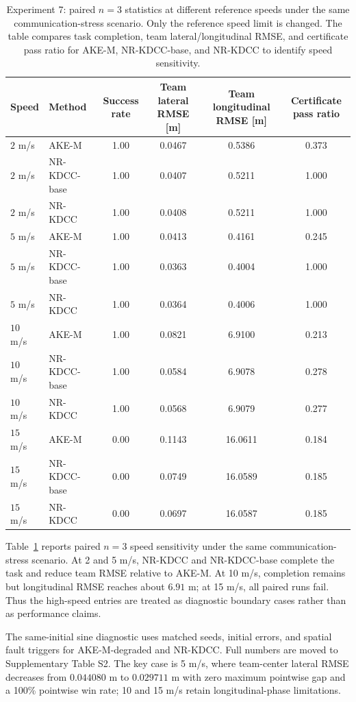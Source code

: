 \documentclass[twocolumn,3p,times,procedia]{elsarticle}
\newcommand{\AKE}{AKE-M}
\newcommand{\Method}{NR-KDCC}
\newcommand{\AKEdeg}{AKE-M-degraded}
\newcommand{\MethodBase}{NR-KDCC-base}
\begin{document}
\begin{table}[!t]
\centering
\caption{Experiment 7: paired $n=3$ statistics at different reference speeds under the same communication-stress scenario. Only the reference speed limit is changed. The table compares task completion, team lateral/longitudinal RMSE, and certificate pass ratio for \AKE{}, \MethodBase{}, and \Method{} to identify speed sensitivity.}
\label{tab:speed_sensitivity}
\footnotesize
\begin{tabular}{llcccc}
\toprule
Speed & Method & Success rate & Team lateral RMSE [m] & Team longitudinal RMSE [m] & Certificate pass ratio \\
\midrule
$2$ m/s & \AKE{} & 1.00 & 0.0467 & 0.5386 & 0.373\\
$2$ m/s & \MethodBase{} & 1.00 & 0.0407 & 0.5211 & 1.000\\
$2$ m/s & \Method{} & 1.00 & 0.0408 & 0.5211 & 1.000\\
$5$ m/s & \AKE{} & 1.00 & 0.0413 & 0.4161 & 0.245\\
$5$ m/s & \MethodBase{} & 1.00 & 0.0363 & 0.4004 & 1.000\\
$5$ m/s & \Method{} & 1.00 & 0.0364 & 0.4006 & 1.000\\
$10$ m/s & \AKE{} & 1.00 & 0.0821 & 6.9100 & 0.213\\
$10$ m/s & \MethodBase{} & 1.00 & 0.0584 & 6.9078 & 0.278\\
$10$ m/s & \Method{} & 1.00 & 0.0568 & 6.9079 & 0.277\\
$15$ m/s & \AKE{} & 0.00 & 0.1143 & 16.0611 & 0.184\\
$15$ m/s & \MethodBase{} & 0.00 & 0.0749 & 16.0589 & 0.185\\
$15$ m/s & \Method{} & 0.00 & 0.0697 & 16.0587 & 0.185\\
\bottomrule
\end{tabular}
\end{table}

Table~\ref{tab:speed_sensitivity} reports paired $n=3$ speed sensitivity under the same communication-stress scenario. At 2 and 5 m/s, \Method{} and \MethodBase{} complete the task and reduce team RMSE relative to \AKE{}. At 10 m/s, completion remains but longitudinal RMSE reaches about $6.91$ m; at 15 m/s, all paired runs fail. Thus the high-speed entries are treated as diagnostic boundary cases rather than as performance claims.

The same-initial sine diagnostic uses matched seeds, initial errors, and spatial fault triggers for \AKEdeg{} and \Method{}. Full numbers are moved to Supplementary Table S2. The key case is 5 m/s, where team-center lateral RMSE decreases from $0.044080$ m to $0.029711$ m with zero maximum pointwise gap and a 100\% pointwise win rate; 10 and 15 m/s retain longitudinal-phase limitations.
\end{document}

